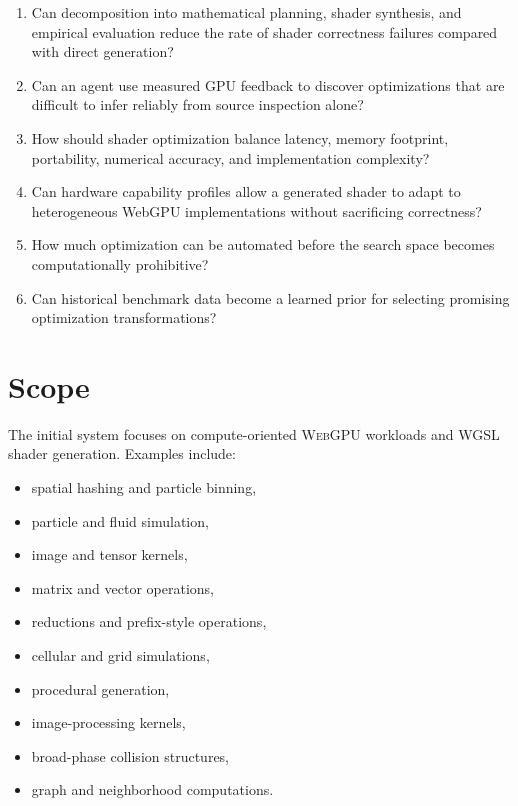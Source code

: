 \documentclass[11pt,a4paper,oneside]{report}
\newcommand{\WGSL}{\textsc{WGSL}}
\newcommand{\WebGPU}{\textsc{WebGPU}}
\begin{document}
\begin{enumerate}[label=\textbf{RQ\arabic*:}]
  \item Can decomposition into mathematical planning, shader synthesis, and empirical evaluation
        reduce the rate of shader correctness failures compared with direct generation?
  \item Can an agent use measured GPU feedback to discover optimizations that are difficult to
        infer reliably from source inspection alone?
  \item How should shader optimization balance latency, memory footprint, portability, numerical
        accuracy, and implementation complexity?
  \item Can hardware capability profiles allow a generated shader to adapt to heterogeneous
        WebGPU implementations without sacrificing correctness?
  \item How much optimization can be automated before the search space becomes computationally
        prohibitive?
  \item Can historical benchmark data become a learned prior for selecting promising optimization
        transformations?
\end{enumerate}

\section{Scope}

The initial system focuses on compute-oriented \WebGPU{} workloads and \WGSL{} shader generation.
Examples include:

\begin{itemize}
  \item spatial hashing and particle binning,
  \item particle and fluid simulation,
  \item image and tensor kernels,
  \item matrix and vector operations,
  \item reductions and prefix-style operations,
  \item cellular and grid simulations,
  \item procedural generation,
  \item image-processing kernels,
  \item broad-phase collision structures,
  \item graph and neighborhood computations.
\end{itemize}
\end{document}
